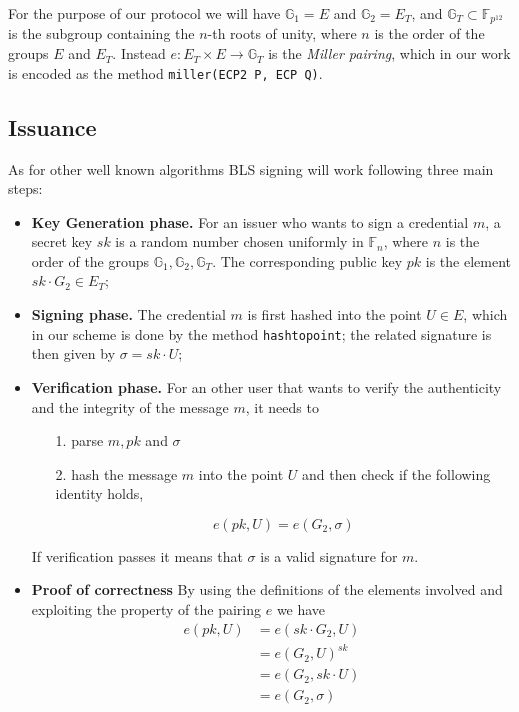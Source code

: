 For the purpose of our protocol we will have $\mathbb{G}_1 = E$ and
$\mathbb{G}_2 = E_T$, and $\mathbb{G}_T\subset \mathbb{F}_{p^{12}}$ is
the subgroup containing the $n$-th roots of unity, where $n$ is the
order of the groups $E$ and $E_T$. Instead $e: E_T \times E\to
\mathbb{G}_T$ is the \emph{Miller pairing}, which in our work is
encoded as the method \verb!miller(ECP2 P, ECP Q)!. \\


\subsection{Issuance} \label{issuance}

As for other well known algorithms BLS signing will work following
three main steps:
\begin{itemize}

\item \textbf{Key Generation phase.} For an issuer who wants to sign
  a credential $m$, a secret key $sk$ is a random number chosen
  uniformly in $\mathbb{F}_n$, where $n$ is the order of the
  groups $\mathbb{G}_1, \mathbb{G}_2, \mathbb{G}_T$. The
  corresponding public key $pk$ is the element $sk\cdot G_2\in
  E_T$;

\item \textbf{Signing phase.} The credential $m$ is first hashed into
  the point $U\in E$, which in our scheme is done by the method
  \verb!hashtopoint!; the related signature is then given by $\sigma =
  sk\cdot U$;

\item \textbf{Verification phase.} For an other user that wants to
  verify the authenticity and the integrity of the message $m$, it
  needs to

  \begin{itemize}

  \item [1.] parse $m, pk$ and $\sigma$

  \item [2.] hash the message $m$ into the point $U$ and then
    check if the following identity holds,

    \[
    e(pk,U) = e(G_2,\sigma)
    \]

  \end{itemize}
If verification passes it means that $\sigma$ is a valid signature for
$m$.
\item \textbf{Proof of correctness} By using the definitions of the elements involved and exploiting the property of the pairing $e$ we have
\[
\begin{split}
    e(pk,U) &= e(sk\cdot G_2, U) \\
            &= e(G_2,U)^{sk}\\
            &= e(G_2,sk\cdot U)\\
            &= e(G_2,\sigma)
\end{split}
\]

\end{itemize}

